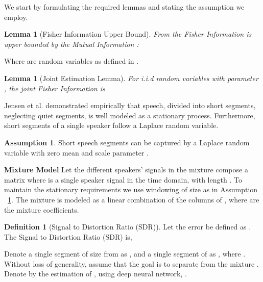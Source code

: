 \documentclass[a4paper]{article}
\theoremstyle{plain}
\newtheorem{lemma}[theorem]{Lemma}
\theoremstyle{definition}
\newtheorem{definition}[theorem]{Definition}
\newtheorem{assumption}[theorem]{Assumption}
\theoremstyle{remark}
\begin{document}
We start by formulating the required lemmas and stating the assumption we employ. \vspace{-2mm}
\begin{lemma}[Fisher Information Upper Bound]
From \cite{Brunel} the Fisher Information  is upper bounded by the Mutual Information :

\label{lemma:fisher_bound}
\end{lemma}
\vspace{-6mm}
Where  are random variables as defined in \cite{Brunel}.


\begin{lemma}[Joint Estimation Lemma]
For  i.i.d random variables with parameter , the joint Fisher Information is

\label{lemma:joint_fisher}
\end{lemma}
\vspace{-3mm}
Jensen et al. \cite{Jensen} demonstrated empirically that speech, divided into short segments, neglecting quiet segments, is well modeled as a stationary process. Furthermore, short segments of a single speaker follow a Laplace random variable. 
\vspace{-2mm}
\begin{assumption}Short speech segments can be captured by a Laplace random variable with zero mean and scale parameter .

\label{asmp:laplace}
\end{assumption}
\vspace{-4mm}



\noindent \textbf{Mixture Model\quad }
Let the different speakers' signals in the mixture compose a matrix 
where  is a single speaker signal in the time domain, with length . To maintain the stationary requirements we use windowing of size  as in Assumption ~\ref{asmp:laplace}.
The mixture  is modeled as a linear combination of the columns of , 
where  are the mixture coefficients.
\begin{definition}[Signal to Distortion Ratio (SDR)]
Let the error  be defined as .
The Signal to Distortion Ratio (SDR) is,


\label{defintion:sdr}
\end{definition}
Denote a single segment of size  from  as , and a single segment of  as  , where . Without loss of generality, assume that the goal is to separate  from the mixture . Denote by  the estimation of , using deep neural network, .
\end{document}
